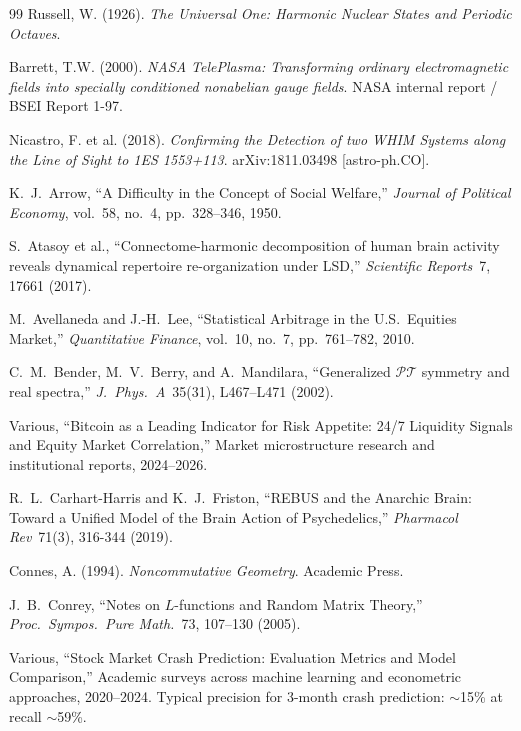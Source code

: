 \documentclass[12pt,oneside]{book}
\begin{document}
\begin{thebibliography}{99}
Russell, W. (1926).
\textit{The Universal One: Harmonic Nuclear States and Periodic Octaves}.

Barrett, T.W. (2000).
\textit{NASA TelePlasma: Transforming ordinary electromagnetic fields into specially conditioned nonabelian gauge fields}.
NASA internal report / BSEI Report 1-97.

Nicastro, F. et al. (2018).
\textit{Confirming the Detection of two WHIM Systems along the Line of Sight to 1ES 1553+113}.
arXiv:1811.03498 [astro-ph.CO].

K.~J.~Arrow,
``A Difficulty in the Concept of Social Welfare,''
\emph{Journal of Political Economy}, vol.~58, no.~4, pp.~328--346, 1950.

S.~Atasoy et al., ``Connectome-harmonic decomposition of human brain activity reveals dynamical repertoire re-organization under LSD,'' \emph{Scientific Reports}\ 7, 17661 (2017).

M.~Avellaneda and J.-H.~Lee,
``Statistical Arbitrage in the U.S.\ Equities Market,''
\emph{Quantitative Finance}, vol.~10, no.~7, pp.~761--782, 2010.

C.~M.~Bender, M.~V.~Berry, and A.~Mandilara, ``Generalized $\mathcal{PT}$ symmetry and real spectra,'' \emph{J.\ Phys.\ A}\ 35(31), L467--L471 (2002).

Various,
``Bitcoin as a Leading Indicator for Risk Appetite: 24/7 Liquidity Signals and Equity Market Correlation,''
Market microstructure research and institutional reports, 2024--2026.

R.~L.~Carhart-Harris and K.~J.~Friston, ``REBUS and the Anarchic Brain: Toward a Unified Model of the Brain Action of Psychedelics,'' \emph{Pharmacol Rev}\ 71(3), 316-344 (2019).

Connes, A. (1994). \emph{Noncommutative Geometry}. Academic Press.

J.~B.~Conrey, ``Notes on $L$-functions and Random Matrix Theory,'' \emph{Proc.\ Sympos.\ Pure Math.}\ 73, 107--130 (2005).

Various,
``Stock Market Crash Prediction: Evaluation Metrics and Model Comparison,''
Academic surveys across machine learning and econometric approaches, 2020--2024.
Typical precision for 3-month crash prediction: $\sim$15\% at recall $\sim$59\%.


\end{thebibliography}
\end{document}
